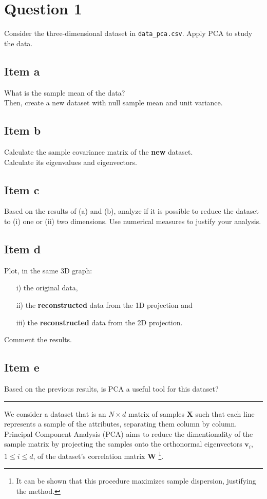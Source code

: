 \section{Question 1}

Consider the three-dimensional dataset in \texttt{data\_pca.csv}. 
Apply PCA to study the data.

\subsection{Item a}
What is the sample mean of the data?\\
Then, create a new dataset with null sample mean and unit variance.

\subsection{Item b}
Calculate the sample covariance matrix of the \textbf{new} dataset.\\
Calculate its eigenvalues and eigenvectors.

\subsection{Item c}
Based on the results of (a) and (b), analyze if it is possible to reduce the dataset to 
(i) one or (ii) two dimensions. 
Use numerical measures to justify your analysis.

\subsection{Item d}
Plot, in the same 3D graph: 
\begin{itemize}
    \item [i)] the original data, 
    \item [ii)] the \textbf{reconstructed} data from the 1D projection and 
    \item [iii)] the \textbf{reconstructed} data from the 2D projection. 
\end{itemize}
Comment the results.

\subsection{Item e}
Based on the previous results, is PCA a useful tool for this dataset?

\noindent\rule{\textwidth}{.5pt}

We consider a dataset that is an $N \times d$ matrix of samples $\mathbf{X}$ such that 
each line represents a sample of the attributes, separating them column by column.
%
Principal Component Analysis (PCA) aims to reduce the dimentionality of the sample matrix by 
projecting the samples onto the orthonormal eigenvectors 
$\mathbf{v}_i$, $1\leq i\leq d$, of the dataset's correlation matrix $\mathbf{W}$%
\footnote{%
    It can be shown that this procedure maximizes sample dispersion, justifying the method.
}.

